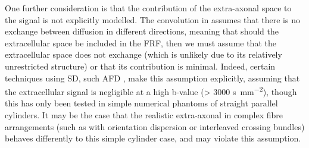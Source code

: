 One further consideration is that the contribution of the extra-axonal space to the signal is not explicitly modelled. The convolution in  assumes that there is no exchange between diffusion in different directions, meaning that should the extracellular space be included in the \ac{FRF}, then we must assume that the extracellular space does not exchange (which is unlikely due to its relatively unrestricted structure) or that its contribution is minimal.
Indeed, certain techniques using \ac{SD}, such \ac{AFD} \cite{Raffelt2012}, make this assumption explicitly, assuming that the extracellular signal is negligible at a high b-value (> 3000 \si{\second\per\milli\metre\squared}), though this has only been tested in simple numerical phantoms of straight parallel cylinders.
It may be the case that the realistic extra-axonal in complex fibre arrangements (such as with orientation dispersion or interleaved crossing bundles) behaves differently to this simple cylinder case, and may violate this assumption. 

